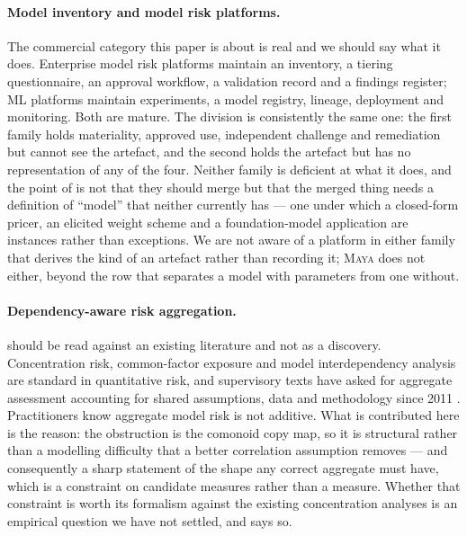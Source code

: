 \documentclass[11pt,a4paper]{article}
\renewcommand{\_}{\oldunderscore\allowbreak}
\theoremstyle{plain}
\theoremstyle{definition}
\theoremstyle{definition}
\theoremstyle{remark}
\begin{document}
\paragraph{Model inventory and model risk platforms.} The commercial category this paper is about is real
and we should say what it does. Enterprise model risk platforms maintain an inventory, a tiering
questionnaire, an approval workflow, a validation record and a findings register; ML platforms maintain
experiments, a model registry, lineage, deployment and monitoring. Both are mature. The division is
consistently the same one: the first family holds materiality, approved use, independent challenge and
remediation but cannot see the artefact, and the second holds the artefact but has no representation of any
of the four. Neither family is deficient at what it does, and the point of  is not
that they should merge but that the merged thing needs a definition of ``model'' that neither currently has
--- one under which a closed-form pricer, an elicited weight scheme and a foundation-model application are
instances rather than exceptions. We are not aware of a platform in either family that derives the kind of
an artefact rather than recording it; \textsc{Maya} does not either, beyond the row that separates
a model with parameters from one without.

\paragraph{Dependency-aware risk aggregation.}  should be read against an existing
literature and not as a discovery. Concentration risk, common-factor exposure and model interdependency
analysis are standard in quantitative risk, and supervisory texts have asked for aggregate assessment
accounting for shared assumptions, data and methodology since 2011 \cite{sr117,sr262,ss123}. Practitioners
know aggregate model risk is not additive. What is contributed here is the reason: the obstruction is the
comonoid copy map, so it is structural rather than a modelling difficulty that a better correlation
assumption removes --- and consequently a sharp statement of the shape any correct aggregate must have,
which is a constraint on candidate measures rather than a measure. Whether that constraint is worth its
formalism against the existing concentration analyses is an empirical question we have not settled, and
 says so.
\end{document}
